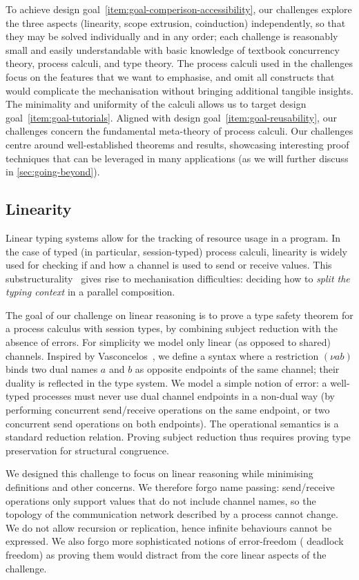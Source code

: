 \documentclass[runningheads]{llncs}
\begin{document}
To achieve design goal~\ref{item:goal-comperison-accessibility}, our challenges explore the three aspects
(linearity, scope extrusion, coinduction) independently, so that they
may be solved individually and in any order; each challenge is
reasonably small and easily understandable with basic knowledge of
textbook concurrency theory, process calculi, and type theory.  The
process calculi used in the challenges focus on the features that
we want to emphasise, and omit all constructs that would complicate the mechanisation without bringing additional
tangible insights.  The minimality and uniformity of the
calculi allows us to target design goal~\ref{item:goal-tutorials}.
Aligned with design goal~\ref{item:goal-reusability}, our challenges concern the fundamental meta-theory of process calculi.
Our challenges centre around well-established theorems and results, showcasing interesting proof techniques that can be leveraged in many applications (as we will further discuss in \cref{sec:going-beyond}).

\subsection{Linearity}
Linear typing systems allow for the tracking of resource usage in a program. In
the case of typed (in particular, session-typed) process calculi, linearity is
widely used for checking if and how a channel is used to send or receive values.
This substructurality~\cite[Ch. 1]{Pierce2004-oq} gives rise to mechanisation difficulties: \eg deciding how to \emph{split the
typing context} in a parallel composition.

The goal of our challenge on linear reasoning is to prove a type safety theorem
for a process calculus with session types, by combining subject
reduction with the absence of errors.  For simplicity we model only linear (as
opposed to shared) channels. Inspired by Vasconcelos~\cite{Vasconcelos2012}, we
define a syntax where a restriction $(\nu ab)$ binds two dual names $a$
and $b$ as opposite endpoints of the same channel; their duality is
reflected in the type system. We model a simple notion of error: a well-typed
processes must never use dual channel endpoints in a non-dual way (\eg by
performing concurrent send/receive operations on the same endpoint, or two
concurrent send operations on both endpoints).
The operational semantics is a standard reduction relation. Proving subject reduction thus requires proving type preservation for structural congruence.

We designed this challenge to focus on linear reasoning while minimising
definitions and other concerns.  We therefore forgo name passing:
send/receive operations only support values that do not include channel names, so
the topology of the communication network described by a process cannot change.
We do not allow recursion or replication, hence infinite behaviours cannot be
expressed. We also forgo more sophisticated notions of error-freedom (\eg
deadlock freedom) as proving them would distract from the core linear
aspects of the challenge.
\end{document}
